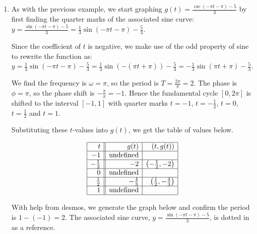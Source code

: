 \documentclass{ximera}
\begin{document}
\begin{example}
\begin{explanation}
\begin{enumerate}
With the help of desmos, we graph one cycle of  $f(t) = 1 - 2 \sec(2t)$ below along with the associated cosine curve,  $y = 1 - 2 \cos(2t)$ which is dotted, and confirm the period is $\pi - 0 = \pi$.

\begin{center}
\end{center}


\item As with the previous example, we start graphing $g(t) = \frac{\csc(-\pi t- \pi ) - 5}{3}$ by first finding the quarter marks of the associated sine curve: $y =\frac{\sin(- \pi t - \pi ) - 5}{3} = \frac{1}{3} \sin( -\pi t - \pi) - \frac{5}{3}$.  



Since the coefficient of $t$ is negative, we make use of the odd property of sine to rewrite the function as:  $y = \frac{1}{3} \sin( - \pi t - \pi ) - \frac{5}{3} =  \frac{1}{3} \sin( -(\pi t + \pi) ) - \frac{5}{3} = -\frac{1}{3} \sin(\pi t  + \pi) - \frac{5}{3}$.


We find the frequency  is $\omega = \pi$, so the period is $T = \frac{2\pi}{\pi} = 2$.  The  phase is $\phi = \pi$, so the phase shift is $-\frac{\pi}{\pi} = -1$.  Hence the fundamental cycle $[0, 2\pi]$ is shifted to the interval $[-1,1]$ with quarter marks $t = -1$, $t = -\frac{1}{2}$, $t=0$, $t = \frac{1}{2}$ and $t=1$.


Substituting these $t$-values into $g(t)$, we get the table of values below.  

\[ \begin{array}{|r||r|r|}  \hline
t & g(t) & (t,g(t))  \\ \hline
-1  & \text{undefined} &   \\ \hline
-\frac{1}{2}  & -2 & \left(-\frac{1}{2}, -2\right)  \\ \hline 
0 & \text{undefined} &   \\ \hline 
\frac{1}{2} & -\frac{4}{3} &  \left(\frac{1}{2}, -\frac{4}{3} \right)  \\  \hline 
1 & \text{undefined} &    \\  \hline 
\end{array} \] 

With help from desmos, we generate the graph below and confirm the period is $1 - (-1) = 2$.   The associated sine curve, $y = \frac{\sin(- \pi t- \pi) - 5}{3}$, is dotted in as a reference.

\begin{center}
\end{center}

\end{enumerate}
\end{explanation}
\end{example}
\end{document}
